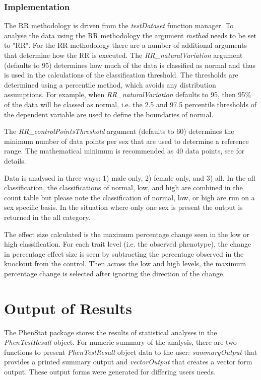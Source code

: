 \documentclass[12pt,a4paper]{article}
\begin{document}
\subsubsection{Implementation}
The RR methodology is driven from the \textit{testDataset} function manager. To analyse the data using the RR methodology the argument \textit{method} needs to be set to "RR".  For the RR methodology there are a number of additional arguments that determine how the RR is executed. The \textit{RR\_naturalVariation} argument (defaults to 95) determines how much of the data is classified as normal and thus is used in the calculations of the classification threshold. The thresholds are determined using a percentile method, which avoids any distribution assumptions. 
For example, when \textit{RR\_naturalVariation} defaults to 95, then 95\%  of the data will be classed as normal, i.e. the 2.5 and 97.5 percentile thresholds of the dependent variable are used to define the boundaries of normal. 

The \textit{RR\_controlPointsThreshold} argument (defaults to 60)  determines the minimum number of data points per sex that are used to determine a reference range.  The mathematical minimum is recommended as 40 data points, see \cite{Solberg} for details.

Data is analysed in three ways: 1) male only, 2) female only, and 3)  all. In the all classification, the classifications of normal, low, and high are combined in the count table but please note the classification of normal, low, or high are run on a sex specific basis.  In the situation where only one sex is present the output is returned in the all category.

The effect size calculated is the maximum percentage change seen in the low or high classification. For each trait level (i.e. the observed phenotype), the change in percentage effect size is seen by subtracting the percentage observed in the knockout from the control. Then across the low and high levels, the maximum percentage change is selected after ignoring the direction of the change.

\section{Output of Results}
\label{section:Results}
The PhenStat package stores the results of statistical analyses in the \textit{PhenTestResult} object.  
For numeric summary of the analysis, there are two functions to present \textit{PhenTestResult} object data to the user: 
\textit{summaryOutput} that provides a printed summary output and \textit{vectorOutput} that creates a vector form output. 
These output forms were generated for differing users needs. 
\end{document}
